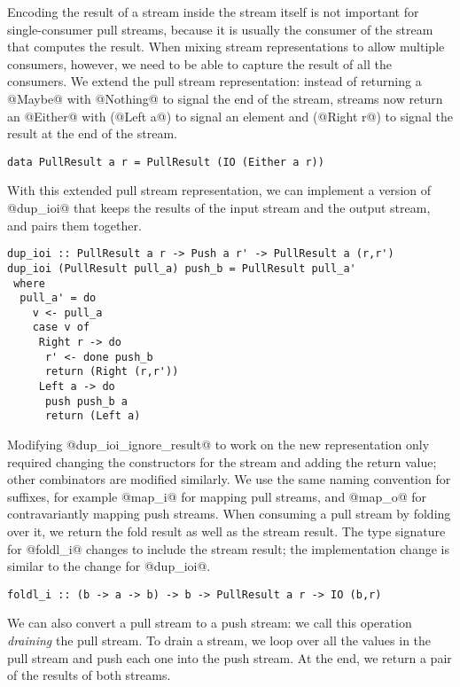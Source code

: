 Encoding the result of a stream inside the stream itself is not important for single-consumer pull streams, because it is usually the consumer of the stream that computes the result.
When mixing stream representations to allow multiple consumers, however, we need to be able to capture the result of all the consumers.
We extend the pull stream representation: instead of returning a @Maybe@ with @Nothing@ to signal the end of the stream, streams now return an @Either@ with (@Left a@) to signal an element and (@Right r@) to signal the result at the end of the stream.

\begin{lstlisting}
data PullResult a r = PullResult (IO (Either a r))
\end{lstlisting}

With this extended pull stream representation, we can implement a version of @dup_ioi@ that keeps the results of the input stream and the output stream, and pairs them together.

\begin{lstlisting}
dup_ioi :: PullResult a r -> Push a r' -> PullResult a (r,r')
dup_ioi (PullResult pull_a) push_b = PullResult pull_a'
 where
  pull_a' = do
    v <- pull_a
    case v of
     Right r -> do
      r' <- done push_b
      return (Right (r,r'))
     Left a -> do
      push push_b a
      return (Left a)
\end{lstlisting}

Modifying @dup_ioi_ignore_result@ to work on the new representation only required changing the constructors for the stream and adding the return value; other combinators are modified similarly.
We use the same naming convention for suffixes, for example @map_i@ for mapping pull streams, and @map_o@ for contravariantly mapping push streams.
When consuming a pull stream by folding over it, we return the fold result as well as the stream result.
The type signature for @foldl_i@ changes to include the stream result; the implementation change is similar to the change for @dup_ioi@.

\begin{lstlisting}
foldl_i :: (b -> a -> b) -> b -> PullResult a r -> IO (b,r)
\end{lstlisting}

We can also convert a pull stream to a push stream: we call this operation \emph{draining} the pull stream.
To drain a stream, we loop over all the values in the pull stream and push each one into the push stream.
At the end, we return a pair of the results of both streams.

